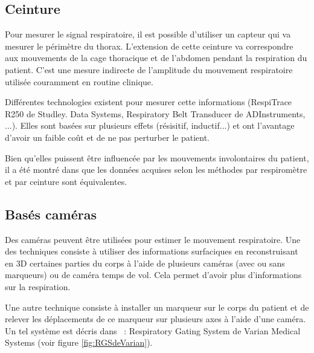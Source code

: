 \subsection{Ceinture}

Pour mesurer le signal respiratoire, il est possible d'utiliser un capteur qui va mesurer le périmètre du thorax. L'extension de cette ceinture va correspondre aux mouvements de la cage thoracique et de l'abdomen pendant la respiration du patient. C'est une mesure indirecte de l'amplitude du mouvement respiratoire utilisée couramment en routine clinique. 

Différentes technologies existent pour mesurer cette informations (RespiTrace R250 de Studley. Data Systems, Respiratory Belt Transducer de ADInstruments, ...). Elles sont basées sur plusieurs effets (résisitif, inductif...) et ont l'avantage d'avoir un faible coût et de ne pas perturber le patient.

Bien qu'elles puissent être influencée par les mouvements involontaires du patient, il a été montré dans \cite{Guivarch2004Sync} que les données acquises selon les méthodes par respiromètre et par ceinture sont équivalentes.

\subsection{Basés caméras}

Des caméras peuvent être utilisées pour estimer le mouvement respiratoire. Une des techniques consiste à utiliser des informations surfaciques en reconstruisant en 3D certaines parties du corps à l'aide de plusieurs caméras (avec ou sans marqueurs) ou de caméra temps de vol. Cela permet d'avoir plus d'informations sur la respiration.

Une autre technique consiste à installer un marqueur sur le corps du patient et de relever les déplacements de ce marqueur sur plusieurs axes à l'aide d'une caméra. Un tel système est décris dans~\cite{nehmeh2002effect} : Respiratory Gating System de Varian Medical Systems (voir figure \ref{fig:RGSdeVarian}).


